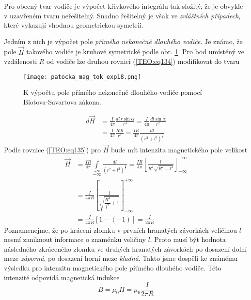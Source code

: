     Pro obecný tvar vodiče je výpočet křivkového integrálu tak složitý, že je obvykle v uzavřeném 
    tvaru neřešitelný. Snadno řešitelný je však ve \emph{zvláštních případech}, které vykazují 
    vhodnou geometrickou symetrii.
    
    Jedním z nich je výpočet pole \emph{přímého nekonečně dlouhého vodiče}. Je známo, že pole 
    \(\vec{H}\) takového vodiče je kruhově symetrické podle obr. 
    \ref{es:fig_patocka_mag_tok_exp18}. Pro bod umístěný ve vzdálenosti \(R\) od vodiče lze 
    druhou rovnici (\ref{TEO:eq134}) modifikovat do tvaru      
    \begin{figure}[ht!]
      \centering
      \texttt{[image: patocka\_mag\_tok\_exp18.png]}
      \caption{K výpočtu pole přímého nekonečně dlouhého vodiče pomocí Biotova-Savartova zákona.}
      \label{es:fig_patocka_mag_tok_exp18}
    \end{figure}
    \begin{align*}
      d\vec{H} &= \frac{I}{4\pi}\frac{dl\,r\sin\alpha}{r^3}
                = \frac{I}{4\pi}\frac{dl\sin\alpha}{r^2}                          \\
               &= \frac{I}{4\pi}\frac{Rdl}{r^3}
                = \frac{IR}{4\pi}\frac{dl}{\left(r^2+l^2\right)^{\frac{3}{2}}}
    \end{align*}
    Podle rovnice (\ref{TEO:eq135}) pro \(\vec{H}\) bude mít intenzita magnetického pole 
    velikost 
    \begin{align*}
      \vec{H} &= \frac{IR}{4\pi}\int\limits_{-\infty}\limits^{+\infty}
                 \frac{dl}{\left(r^2+l^2\right)^{\frac{3}{2}}}
               = \frac{IR}{4\pi} 
                 \left[\frac{l}{R^2\sqrt{R^2+l^2}}\right]_{-\infty}^{+\infty}         \\
              &= \frac{I}{4\pi R}
                 \left[\frac{1}{\sqrt{\dfrac{R^2}{l^2}+1}}\right]_{-\infty}^{+\infty} \\
              &= \frac{I}{4\pi R}[1-(-1)] = \frac{I}{2\pi R}
    \end{align*}
    Poznamenejme, že po krácení zlomku v prvních hranatých závorkách veličinou \(l\) nesmí 
    zaniknout informace o znaménku veličiny \(l\). Proto musí být hodnota následného zkráceného 
    zlomku ve druhých hranatých závorkách po dosazení dolní meze \emph{záporná}, po dosazení horní 
    meze \emph{kladná}. Takto jsme dospěli ke známému výsledku pro intenzitu magnetického pole 
    přímého dlouhého vodiče. Této intenzitě odpovídá magnetická indukce
    \begin{equation*}
      B = \mu_0H = \mu_0\frac{I}{2\pi R}
    \end{equation*}
    
